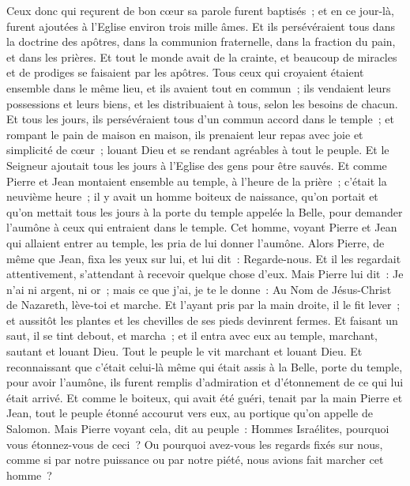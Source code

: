\begin{multicols}{2}
Ceux donc qui reçurent de bon cœur sa parole furent baptisés~; et en ce jour-là, furent ajoutées à l'Eglise environ trois mille âmes.
Et ils persévéraient tous dans la doctrine des apôtres, dans la communion fraternelle, dans la fraction du pain, et dans les prières.
Et tout le monde avait de la crainte, et beaucoup de miracles et de prodiges se faisaient par les apôtres.
Tous ceux qui croyaient étaient ensemble dans le même lieu, et ils avaient tout en commun~;
ils vendaient leurs possessions et leurs biens, et les distribuaient à tous, selon les besoins de chacun.
Et tous les jours, ils persévéraient tous d'un commun accord dans le temple~; et rompant le pain de maison en maison, ils prenaient leur repas avec joie et simplicité de cœur~;
louant Dieu et se rendant agréables à tout le peuple. Et le Seigneur ajoutait tous les jours à l'Eglise des gens pour être sauvés.
\VerseOne{}Et comme Pierre et Jean montaient ensemble au temple, à l'heure de la prière~; c'était la neuvième heure~;
il y avait un homme boiteux de naissance, qu'on portait et qu'on mettait tous les jours à la porte du temple appelée la Belle, pour demander l'aumône à ceux qui entraient dans le temple. 
Cet homme, voyant Pierre et Jean qui allaient entrer au temple, les pria de lui donner l'aumône.
Alors Pierre, de même que Jean, fixa les yeux sur lui, et lui dit~: Regarde-nous.
Et il les regardait attentivement, s'attendant à recevoir quelque chose d'eux.
Mais Pierre lui dit~: Je n'ai ni argent, ni or~; mais ce que j'ai, je te le donne~: Au Nom de Jésus-Christ de Nazareth, lève-toi et marche.
Et l'ayant pris par la main droite, il le fit lever~; et aussitôt les plantes et les chevilles de ses pieds devinrent fermes.
Et faisant un saut, il se tint debout, et marcha~; et il entra avec eux au temple, marchant, sautant et louant Dieu.
Tout le peuple le vit marchant et louant Dieu.
Et reconnaissant que c'était celui-là même qui était assis à la Belle, porte du temple, pour avoir l'aumône, ils furent remplis d'admiration et d'étonnement de ce qui lui était arrivé.
Et comme le boiteux, qui avait été guéri, tenait par la main Pierre et Jean, tout le peuple étonné accourut vers eux, au portique qu'on appelle de Salomon.
Mais Pierre voyant cela, dit au peuple~: Hommes Israélites, pourquoi vous étonnez-vous de ceci~? Ou pourquoi avez-vous les regards fixés sur nous, comme si par notre puissance ou par notre piété, nous avions fait marcher cet homme~?

\end{multicols}
